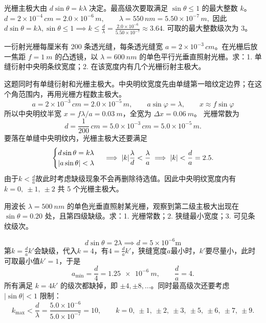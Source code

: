 \documentclass[lang=cn,11pt]{elegantbook}
\begin{document}
\begin{solution}
光栅主极大由 \(d\sin\theta=k\lambda\) 决定。最高级次要取满足 \(\sin\theta\le1\) 的最大整数 \(k\)。
 \(d=2\times10^{-4}\,\si{cm}=2.0\times10^{-6}\,\si{m}, \qquad \lambda=550\,\si{nm}=5.50\times10^{-7}\,\si{m},\) 
因此
 \(d\sin\theta=k\lambda,\sin\theta\le1 \implies k\le\frac{d}{\lambda} =\frac{2.0\times10^{-6}}{5.50\times10^{-7}}\approx3.64.\) 
可取的最大整数级次为 \(3\)。
\end{solution}

\begin{exercise}
一衍射光栅每厘米有 \(200\) 条透光缝，每条透光缝宽 \(a=2\times10^{-3}\,\si{cm}\)。在光栅后放一焦距 \(f=\SI{1}{m}\) 的凸透镜，以 \(\lambda=\SI{600}{nm}\) 的单色平行光垂直照射光栅。求：1. 单缝衍射中央明条纹宽度；2. 在该宽度内有几个光栅衍射主极大。
\end{exercise}

\begin{solution}
这题同时有单缝衍射和光栅主极大。中央明纹宽度先由单缝第一暗纹定边界；在这个角范围内，再用光栅方程数主极大。
\[
a=2\times10^{-3}\,\si{cm}=2.0\times10^{-5}\,\si{m},\qquad
a\sin\varphi=\lambda,\qquad
x\approx f\sin\varphi
\]
所以中央明纹半宽 \(x=f\lambda/a=\SI{0.03}{m}\)，全宽为 \(\Delta x=\SI{0.06}{m}\)。
光栅常数为
\[
d=\frac{1}{200}\,\si{cm}=5.0\times10^{-3}\,\si{cm}=5.0\times10^{-5}\,\si{m}.
\]
要落在单缝中央明纹内，光栅主极大还要满足
 \[\begin{cases}d\sin\theta=k\lambda\\|a\sin\theta|<\lambda\end{cases} \implies \abs{k}\frac{\lambda}{d}<\frac{\lambda}{a} \implies \abs{k}<\frac{d}{a}=2.5.\]
由于$k<\frac{d}{a}$故此时考虑缺级现象不会再删除待选值。因此中央明纹宽度内有 \(k=0,\ \pm1,\ \pm2\) 共 5 个光栅主极大。
\end{solution}

\begin{exercise}
用波长 \(\lambda=\SI{500}{nm}\) 的单色光垂直照射某光栅，观察到第二级主极大出现在 \(\sin\theta=0.20\) 处，且第四级缺级。求：1. 光栅常数；2. 狭缝最小宽度；3. 可见条纹级次。
\end{exercise}

\begin{solution}
\[d\sin\theta=2\lambda\implies d=5\times10^{-6}\text{m}\]
第$k=\frac{d}{a}k'$会缺级，代入$k=4$，有$4=\frac{d}{a}k'$，狭缝宽度$a$最小时，$k'$要尽量小，此时可取最小值$k'=1$，于是
 \[a_{\min}=\frac{d}{4}=\SI{1.25e-6}{m},\qquad \frac{d}{a}=4.\] 
所有满足 \(k=4k'\) 的级次都缺掉，即 \(\pm4,\pm8,\dots\)。同时最高级次还要考虑 \(|\sin\theta|<1\) 限制：
 \[k_{\max}<\frac{d}{\lambda} =\frac{5.0\times10^{-6}}{5.0\times10^{-7}}=10, \qquad k=0,\ \pm1,\ \pm2,\ \pm3,\ \pm5,\ \pm6,\ \pm7,\ \pm9.\]
\end{solution}
\end{document}
